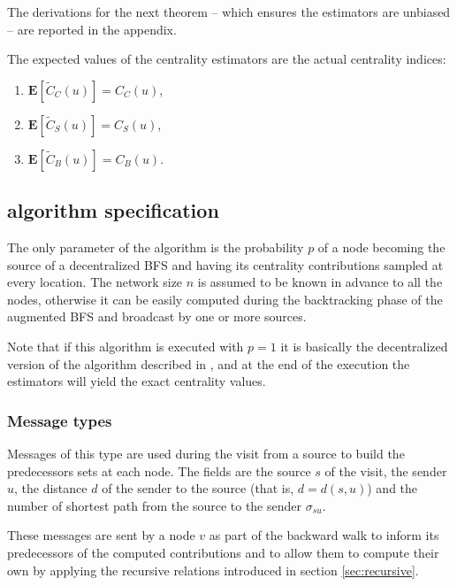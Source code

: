 The derivations for the next theorem -- which ensures the estimators are unbiased -- are reported in the appendix.

\begin{theorem}
\label{th:expect}
The expected values of the centrality estimators are the actual centrality indices:
 \begin{enumerate}[label=\textup{(\alph*)}]
  \item $\mathbf{E}[\widetilde{C}_C(u)] = \widehat{C}_C(u)$,
  \item $\mathbf{E}[\widetilde{C}_S(u)] = C_S(u)$,
  \item $\mathbf{E}[\widetilde{C}_B(u)] = C_B(u)$.
  \end{enumerate}
\end{theorem}

\subsection{\multibfs{} algorithm specification}

The only parameter of the algorithm is the probability $p$ of a node becoming the source of a decentralized BFS and having its centrality contributions sampled at every location. The network size $n$ is assumed to be known in advance to all the nodes, otherwise it can be easily computed during the backtracking phase of the augmented BFS and broadcast by one or more sources.

\pagebreak
Note that if this algorithm is executed with $p=1$ it is basically the decentralized version of the algorithm described in \cite{brandes2001}, and at the end of the execution the estimators will yield the exact centrality values.

\subsubsection{Message types}
\begin{description}[leftmargin=0cm]
\item[\mdiscargs{s}{u}{d}] Messages of this type are used during the visit from a source to build the predecessors sets at each node. The fields are the source $s$ of the visit, the sender $u$, the distance $d$ of the sender to the source (that is, $d = d(s,u)$) and the number of shortest path from the source to the sender $\sigma_{su}$.

\item[\mrepargs{s}{v}] These messages are sent by a node $v$ as part of the backward walk to inform its predecessors of the computed contributions and to allow them to compute their own by applying the recursive relations introduced in section \ref{sec:recursive}.
\end{description}

